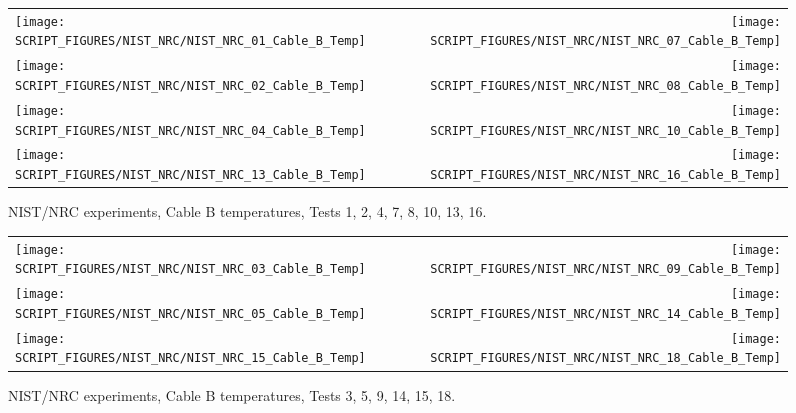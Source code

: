 \begin{figure}[p]
\begin{tabular*}{\textwidth}{l@{\extracolsep{\fill}}r}
\texttt{[image: SCRIPT\_FIGURES/NIST\_NRC/NIST\_NRC\_01\_Cable\_B\_Temp]} &
\texttt{[image: SCRIPT\_FIGURES/NIST\_NRC/NIST\_NRC\_07\_Cable\_B\_Temp]} \\
\texttt{[image: SCRIPT\_FIGURES/NIST\_NRC/NIST\_NRC\_02\_Cable\_B\_Temp]} &
\texttt{[image: SCRIPT\_FIGURES/NIST\_NRC/NIST\_NRC\_08\_Cable\_B\_Temp]} \\
\texttt{[image: SCRIPT\_FIGURES/NIST\_NRC/NIST\_NRC\_04\_Cable\_B\_Temp]} &
\texttt{[image: SCRIPT\_FIGURES/NIST\_NRC/NIST\_NRC\_10\_Cable\_B\_Temp]} \\
\texttt{[image: SCRIPT\_FIGURES/NIST\_NRC/NIST\_NRC\_13\_Cable\_B\_Temp]} &
\texttt{[image: SCRIPT\_FIGURES/NIST\_NRC/NIST\_NRC\_16\_Cable\_B\_Temp]}
\end{tabular*}
\caption[NIST/NRC experiments, Cable B temperatures, Tests 1, 2, 4, 7, 8, 10, 13, 16]{NIST/NRC experiments, Cable B temperatures, Tests 1, 2, 4, 7, 8, 10, 13, 16.}
\label{NIST_NRC_Cable_B_Closed}
\end{figure}

\begin{figure}[p]
\begin{tabular*}{\textwidth}{l@{\extracolsep{\fill}}r}
\texttt{[image: SCRIPT\_FIGURES/NIST\_NRC/NIST\_NRC\_03\_Cable\_B\_Temp]} &
\texttt{[image: SCRIPT\_FIGURES/NIST\_NRC/NIST\_NRC\_09\_Cable\_B\_Temp]} \\
\texttt{[image: SCRIPT\_FIGURES/NIST\_NRC/NIST\_NRC\_05\_Cable\_B\_Temp]} &
\texttt{[image: SCRIPT\_FIGURES/NIST\_NRC/NIST\_NRC\_14\_Cable\_B\_Temp]} \\
\texttt{[image: SCRIPT\_FIGURES/NIST\_NRC/NIST\_NRC\_15\_Cable\_B\_Temp]} &
\texttt{[image: SCRIPT\_FIGURES/NIST\_NRC/NIST\_NRC\_18\_Cable\_B\_Temp]}
\end{tabular*}
\caption[NIST/NRC experiments, Cable B temperatures, Tests 3, 5, 9, 14, 15, 18]{NIST/NRC experiments, Cable B temperatures, Tests 3, 5, 9, 14, 15, 18.}
\label{NIST_NRC_Cable_B_Open}
\end{figure}

